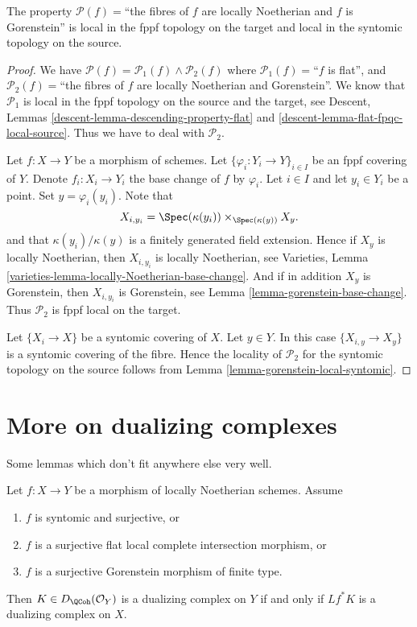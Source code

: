 \begin{lemma}
\label{lemma-gorenstein-local-source-and-target}
The property
$\mathcal{P}(f)=$``the fibres of $f$ are locally Noetherian and $f$ is
Gorenstein'' is local in the fppf topology on the target and
local in the syntomic topology on the source.
\end{lemma}

\begin{proof}
We have
$\mathcal{P}(f) =
\mathcal{P}_1(f) \wedge \mathcal{P}_2(f)$
where
$\mathcal{P}_1(f)=$``$f$ is flat'', and
$\mathcal{P}_2(f)=$``the fibres of $f$ are locally Noetherian
and Gorenstein''.
We know that $\mathcal{P}_1$ is
local in the fppf topology on the source and the target, see
Descent, Lemmas \ref{descent-lemma-descending-property-flat} and
\ref{descent-lemma-flat-fpqc-local-source}. Thus we have to deal
with $\mathcal{P}_2$.

\medskip\noindent
Let $f : X \to Y$ be a morphism of schemes.
Let $\{\varphi_i : Y_i \to Y\}_{i \in I}$ be an fppf covering of $Y$.
Denote $f_i : X_i \to Y_i$ the base change of $f$ by $\varphi_i$.
Let $i \in I$ and let $y_i \in Y_i$ be a point.
Set $y = \varphi_i(y_i)$. Note that
$$
X_{i, y_i} = \Spec(\kappa(y_i)) \times_{\Spec(\kappa(y))} X_y.
$$
and that $\kappa(y_i)/\kappa(y)$ is a finitely generated field
extension. Hence if $X_y$ is locally Noetherian, then
$X_{i, y_i}$ is locally Noetherian, see
Varieties, Lemma \ref{varieties-lemma-locally-Noetherian-base-change}.
And if in addition $X_y$ is Gorenstein,
then $X_{i, y_i}$ is Gorenstein, see
Lemma \ref{lemma-gorenstein-base-change}.
Thus $\mathcal{P}_2$ is fppf local on the target.

\medskip\noindent
Let $\{X_i \to X\}$ be a syntomic covering of $X$.
Let $y \in Y$. In this case $\{X_{i, y} \to X_y\}$ is a
syntomic covering of the fibre. Hence the locality of $\mathcal{P}_2$
for the syntomic topology on the source follows from
Lemma \ref{lemma-gorenstein-local-syntomic}.
\end{proof}




\section{More on dualizing complexes}
\label{section-more-dualizing}

\noindent
Some lemmas which don't fit anywhere else very well.

\begin{lemma}
\label{lemma-descent-ascent}
Let $f : X \to Y$ be a morphism of locally Noetherian schemes. Assume
\begin{enumerate}
\item $f$ is syntomic and surjective, or
\item $f$ is a surjective flat local complete intersection morphism, or
\item $f$ is a surjective Gorenstein morphism of finite type.
\end{enumerate}
Then $K \in D_\QCoh(\mathcal{O}_Y)$ is a dualizing complex on $Y$ if and only
if $Lf^*K$ is a dualizing complex on $X$.
\end{lemma}


